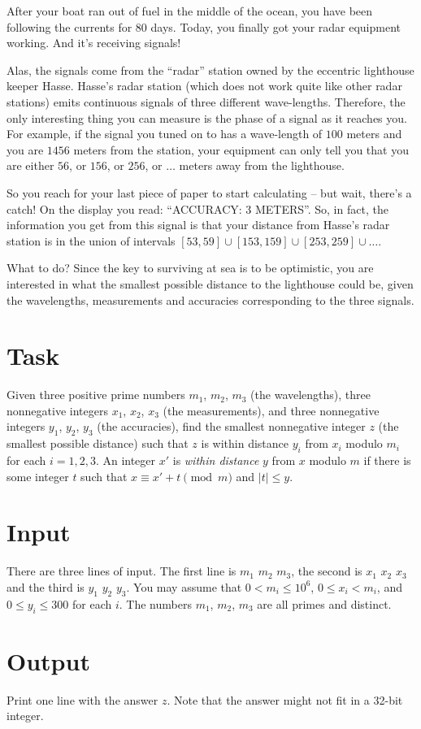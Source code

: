 

\noindent
After your boat ran out of fuel in the middle of the ocean, you have been following the currents for 80 days. Today, you finally got your radar equipment working. And it's receiving signals! 

Alas, the signals come from the ``radar'' station owned by the eccentric lighthouse keeper Hasse. Hasse's radar station (which does not work quite like other radar stations) emits continuous signals of three different wave-lengths. Therefore, the only interesting thing you can measure is the phase of a signal as it reaches you. For example, if the signal you tuned on to has a wave-length of $100$ meters and you are $1456$ meters from the station, your equipment can only tell you that you are either $56$, or $156$, or $256$, or $\dots$ meters away from the lighthouse. 

So you reach for your last piece of paper to start calculating -- but wait, there's a catch! On the display you read: ``ACCURACY: 3 METERS''. So, in fact, the information you get from this signal is that your distance from Hasse's radar station is in the union of intervals $[53,59] \cup [153, 159] \cup [253, 259] \cup \dots$. 

What to do? Since the key to surviving at sea is to be optimistic, you are interested in what the smallest possible distance to the lighthouse could be, given the wavelengths, measurements and accuracies corresponding to the three signals.

\section*{Task}
Given three positive prime numbers $m_1$, $m_2$, $m_3$ (the wavelengths), three nonnegative
integers $x_1$, $x_2$, $x_3$ (the measurements), and three nonnegative integers $y_1$, $y_2$, $y_3$
(the accuracies), find the smallest nonnegative integer $z$ (the smallest possible distance) such
that $z$ is within distance $y_i$ from $x_i$ modulo $m_i$ for each $i = 1,2,3$. An integer $x'$ is
\emph{within distance} $y$ from $x$ modulo $m$ if there is some integer $t$ such that $x \equiv x' + t
\pmod{m}$ and $|t| \leq y$.

\section*{Input}
There are three lines of input. The first line is $m_1$ $m_2$ $m_3$, the second is $x_1$ $x_2$
$x_3$ and the third is $y_1$ $y_2$ $y_3$. You may assume that $0 < m_i \leq 10^6$, $0 \leq x_i <
m_i$, and $0 \leq y_i \leq 300$ for each $i$. The numbers $m_1$, $m_2$, $m_3$ are all primes and distinct.

\section*{Output}
Print one line with the answer $z$. Note that the answer might not fit in a 32-bit integer.
